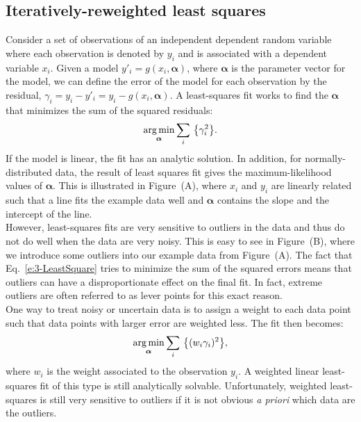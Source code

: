 \subsection{Iteratively-reweighted least squares}
Consider a set of observations of an independent dependent random variable where each observation is denoted by $y_i$ and is associated with a dependent variable $x_i$.
Given a model $y'_i = g(x_i,\bm{\alpha})$, where $\bm{\alpha}$ is the parameter vector for the model, we can define the error of the model for each observation by the residual, $\gamma_i = y_i - y'_i = y_i - g(x_i,\bm{\alpha})$.
A least-squares fit works to find the $\bm{\alpha}$ that minimizes the sum of the squared residuals:
\begin{equation}
  \operatorname*{arg\,min}_{\bm{\alpha}} \sum\limits_i\, \big \{ \gamma_i^2\big \}.\label{e:3-LeastSquare}
\end{equation}
If the model is linear, the fit has an analytic solution.
In addition, for normally-distributed data, the result of least squares fit gives the maximum-likelihood values of $\bm{\alpha}$.
This is illustrated in Figure~(A), where $x_i$ and $y_i$ are linearly related such that a line fits the example data well and $\bm{\alpha}$ contains the slope and the intercept of the line.\\

However, least-squares fits are very sensitive to outliers in the data and thus do not do well when the data are very noisy.
This is easy to see in Figure~(B), where we introduce some outliers into our example data from Figure~(A).
The fact that Eq.~\ref{e:3-LeastSquare} tries to minimize the sum of the squared errors means that outliers can have a disproportionate effect on the final fit.
In fact, extreme outliers are often referred to as lever points for this exact reason.\\

One way to treat noisy or uncertain data is to assign a weight to each data point such that data points with larger error are weighted less.
The fit then becomes:
\begin{equation}
  \operatorname*{arg\,min}_{\bm{\alpha}} \sum\limits_i\,\big \{ (w_i \gamma_i)^2 \big \},
\end{equation}
where $w_i$ is the weight associated to the observation $y_i$.
A weighted linear least-squares fit of this type is still analytically solvable.
Unfortunately, weighted least-squares is still very sensitive to outliers if it is not obvious \emph{a priori} which data are the outliers. \\


